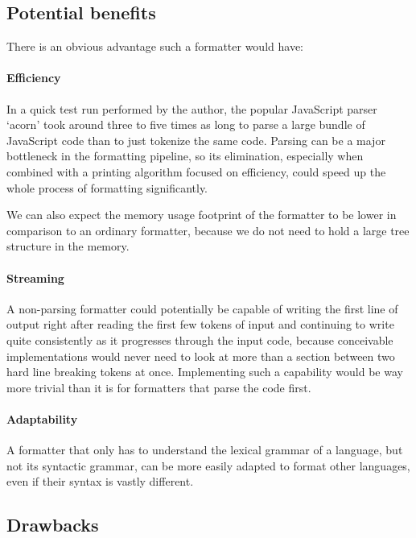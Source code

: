 \subsection{Potential benefits}
There is an obvious advantage such a formatter would have:

\paragraph{Efficiency}
In a quick test run performed by the author, the popular JavaScript parser `acorn'
took around three to five times as long to parse a large bundle of JavaScript code
than to just tokenize the same code.
Parsing can be a major bottleneck in the formatting pipeline,
so its elimination, especially when combined with a printing algorithm focused on efficiency,
could speed up the whole process of formatting significantly.

We can also expect the memory usage footprint of the formatter
to be lower in comparison to an ordinary formatter,
because we do not need to hold a large tree structure in the memory.

\paragraph{Streaming}
A non-parsing formatter could potentially be capable of writing the first line of output
right after reading the first few tokens of input and continuing to write quite consistently
as it progresses through the input code, because conceivable implementations would never
need to look at more than a section between two hard line breaking tokens at once.
Implementing such a capability would be way more trivial than it is for
formatters that parse the code first.

\paragraph{Adaptability}
A formatter that only has to understand the lexical grammar of a language,
but not its syntactic grammar, can be more easily adapted to format other languages,
even if their syntax is vastly different.

\subsection{Drawbacks}
